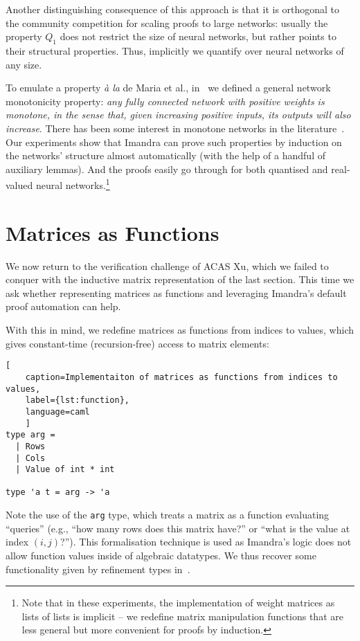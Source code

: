 \documentclass[runningheads]{llncs}
\begin{document}
Another distinguishing consequence of this approach is that it is orthogonal to
the community competition for scaling proofs to large networks: usually the
property $Q_1$ does not restrict the size of neural networks, but rather points
to their structural properties. Thus, implicitly we quantify over neural
networks of any size.

To emulate a property \emph{\`a la} de Maria et al.,  in~\cite{DPKD22} we  defined a general network monotonicity property: \emph{any fully connected
network with positive weights is \emph{monotone}, in the sense that, given
increasing positive inputs, its outputs will also increase}. There has been some
interest in monotone networks in the literature~\cite{JS98,WehenkelL19}.
Our experiments show that Imandra can prove such properties by induction on the networks'
structure almost automatically (with the help of a handful of auxiliary lemmas). And the proofs easily go through for both quantised and real-valued neural networks.\footnote{Note that in these experiments, the implementation of weight matrices as lists of lists is implicit -- we redefine matrix manipulation functions that are less general but more convenient for proofs by induction.}


\section{Matrices as Functions} \label{sec:function}

We now return to the verification challenge of ACAS Xu, which we failed to
conquer with the inductive matrix representation of the last section. This time
we ask whether representing matrices as functions and leveraging Imandra's
default proof automation can help.

With this in mind, we redefine matrices as functions from indices to values, which gives
constant-time (recursion-free) access to matrix elements:

\begin{lstlisting}[
	caption=Implementaiton of matrices as functions from indices to values,
	label={lst:function},
	language=caml
	]
type arg =
  | Rows
  | Cols
  | Value of int * int

type 'a t = arg -> 'a
\end{lstlisting}

Note the use of the \lstinline{arg} type, which treats a matrix as a function evaluating ``queries'' (e.g., ``how many rows does this matrix have?'' or ``what is the value at index $(i,j)$?''). This formalisation technique is used as Imandra's logic does not allow function values inside of algebraic datatypes. %
We thus recover some functionality given by refinement types in~\cite{KokkeKKAA20}.  
\end{document}
